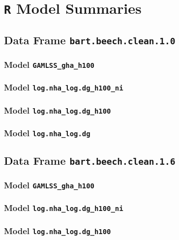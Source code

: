 \section{\texttt{R} Model Summaries}

\subsection{Data Frame \texttt{bart.beech.clean.1.0}}
\subsubsection{Model \texttt{GAMLSS\_gha\_h100}}

\subsubsection{Model \texttt{log.nha\_log.dg\_h100\_ni}}

\subsubsection{Model \texttt{log.nha\_log.dg\_h100}}

\subsubsection{Model \texttt{log.nha\_log.dg}}


\subsection{Data Frame \texttt{bart.beech.clean.1.6}}
\subsubsection{Model \texttt{GAMLSS\_gha\_h100}}

\subsubsection{Model \texttt{log.nha\_log.dg\_h100\_ni}}

\subsubsection{Model \texttt{log.nha\_log.dg\_h100}}

